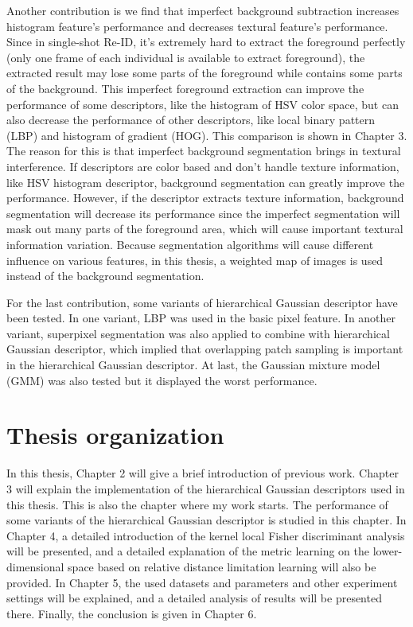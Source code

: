 Another contribution is we find that imperfect background subtraction increases histogram feature's performance and decreases textural feature's performance. Since in single-shot Re-ID, it's extremely hard to extract the foreground perfectly (only one frame of each individual is available to extract foreground), the extracted result may lose some parts of the foreground while contains some parts of the background. This imperfect foreground extraction can improve the performance of some descriptors, like the histogram of HSV color space, but can also decrease the performance of  other descriptors, like local binary pattern (LBP) and histogram of gradient (HOG). This comparison is shown in Chapter 3. The reason for this is that imperfect background segmentation brings in textural interference. If descriptors are color based and don't handle texture information, like HSV histogram descriptor, background segmentation can greatly improve the performance. However, if the descriptor extracts texture information, background segmentation will decrease its performance since the imperfect segmentation will mask out many parts of the foreground area, which will cause important textural information variation. Because segmentation algorithms will cause different influence on various features, in this thesis, a weighted map of images is used instead of the background segmentation.

For the last contribution, some variants of hierarchical Gaussian descriptor have been tested. In one variant, LBP was used in the basic pixel feature. In another variant, superpixel segmentation was also applied to combine with hierarchical Gaussian descriptor, which implied that overlapping patch sampling is important in the hierarchical Gaussian descriptor. At last, the Gaussian mixture model (GMM) was also tested but it displayed the worst performance.

\section{Thesis organization}
In this thesis, Chapter 2 will give a brief introduction of previous work. Chapter 3 will explain the implementation of the hierarchical Gaussian descriptors used in this thesis. This is also the chapter where my work starts. The performance of some variants of the hierarchical Gaussian descriptor is studied in this chapter. In Chapter 4, a detailed introduction of the kernel local Fisher discriminant analysis will be presented, and a detailed explanation of the metric learning on the lower-dimensional space based on relative distance limitation learning will also be provided.
In Chapter 5, the used datasets and parameters and other experiment settings will be explained, and a detailed analysis of results will be presented there. Finally, the conclusion is given in Chapter 6.




